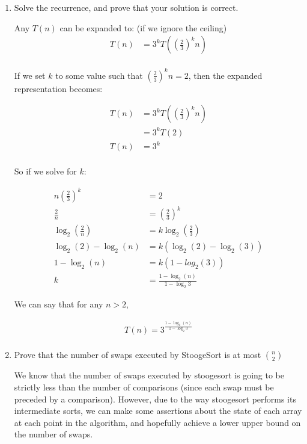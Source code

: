 \documentclass{article}
\newcommand{\question}[1]{\bgroup\color{blue}#1\egroup}
\begin{document}
\begin{enumerate}
\begin{enumerate}
    \item 
      \question{Solve the recurrence, and prove that your solution is correct. }

    Any $T(n)$ can be expanded to: (if we ignore the ceiling)
    \begin{align*}
      T(n) &= 3^k T\left(\left(\frac{2}{3}\right)^k n\right)\\
    \end{align*}

    If we set $k$ to some value such that $\left(\frac{2}{3}\right)^k n = 2$, then the expanded representation becomes:

    \begin{align*}
      T(n) &= 3^k T\left(\left(\frac{2}{3}\right)^k n\right)\\
      &= 3^k T(2)\\
      T(n) &= 3^k\\
    \end{align*}

    So if we solve for $k$:
    
    \begin{align*}
      n \left(\frac{2}{3}\right)^k &= 2\\
      \frac{2}{n} &= \left(\frac{2}{3}\right)^k\\
      \log_2\left(\frac{2}{n}\right) &= k \log_2\left(\frac{2}{3}\right)\\
      \log_2(2) - \log_2(n) &= k\left(\log_2(2) - \log_2(3)\right)\\
      1 - \log_2(n) &= k\left(1 - log_2(3)\right)\\
      k &= \frac{1 - \log_2(n)}{1 - \log_2{3}}
    \end{align*}

    We can say that for any $n > 2$,

    \begin{align*}
      T(n) = 3^{\frac{1 - \log_2(n)}{1 - \log_2{3}}}\\
    \end{align*}

    \item
      \question{Prove that the number of swaps executed by StoogeSort is at most $n \choose 2$}

We know that the number of swaps executed by stoogesort is going to be strictly less than the number of comparisons (since each swap must be preceded by a comparison). However, due to the way stoogesort performs its intermediate sorts, we can make some assertions about the state of each array at each point in the algorithm, and hopefully achieve a lower upper bound on the number of swaps.


\end{enumerate}
\end{enumerate}
\end{document}
